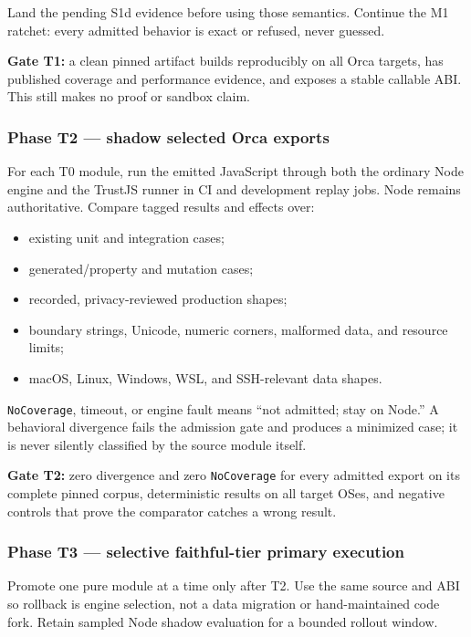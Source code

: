 \documentclass[
  10pt,
  letterpaper,
]{article}
\providecommand{\tightlist}{%
  \setlength{\itemsep}{0pt}\setlength{\parskip}{0pt}}
\begin{document}
Land the pending S1d evidence before using those semantics. Continue the
M1 ratchet: every admitted behavior is exact or refused, never guessed.

\textbf{Gate T1:} a clean pinned artifact builds reproducibly on all
Orca targets, has published coverage and performance evidence, and
exposes a stable callable ABI. This still makes no proof or sandbox
claim.

\subsubsection{Phase T2 --- shadow selected Orca
exports}\label{phase-t2--shadow-selected-orca-exports}

For each T0 module, run the emitted JavaScript through both the ordinary
Node engine and the TrustJS runner in CI and development replay jobs.
Node remains authoritative. Compare tagged results and effects over:

\begin{itemize}
\tightlist
\item
  existing unit and integration cases;
\item
  generated/property and mutation cases;
\item
  recorded, privacy-reviewed production shapes;
\item
  boundary strings, Unicode, numeric corners, malformed data, and
  resource limits;
\item
  macOS, Linux, Windows, WSL, and SSH-relevant data shapes.
\end{itemize}

\texttt{NoCoverage}, timeout, or engine fault means ``not admitted; stay
on Node.'' A behavioral divergence fails the admission gate and produces
a minimized case; it is never silently classified by the source module
itself.

\textbf{Gate T2:} zero divergence and zero \texttt{NoCoverage} for every
admitted export on its complete pinned corpus, deterministic results on
all target OSes, and negative controls that prove the comparator catches
a wrong result.

\subsubsection{Phase T3 --- selective faithful-tier primary
execution}\label{phase-t3--selective-faithful-tier-primary-execution}

Promote one pure module at a time only after T2. Use the same source and
ABI so rollback is engine selection, not a data migration or
hand-maintained code fork. Retain sampled Node shadow evaluation for a
bounded rollout window.
\end{document}
